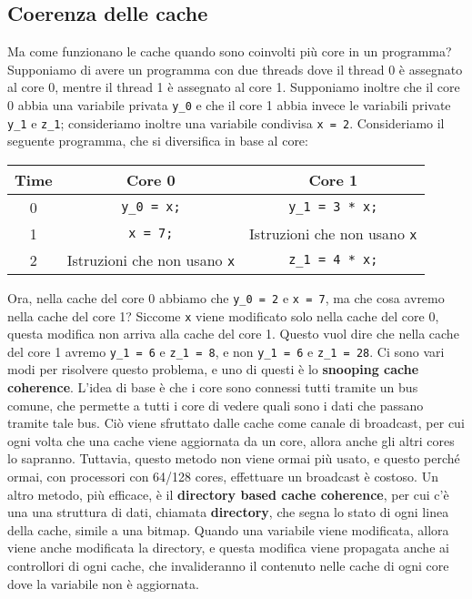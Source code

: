 \subsection{Coerenza delle cache}

Ma come funzionano le cache quando sono coinvolti più core in un programma? Supponiamo di avere un programma con due threads dove il thread 0 è assegnato al core 0, mentre il thread 1 è assegnato al core 1. Supponiamo inoltre che il core 0 abbia una variabile privata \verb|y_0| e che il core 1 abbia invece le variabili private \verb|y_1| e \verb|z_1|; consideriamo inoltre una variabile condivisa \verb|x = 2|. Consideriamo il seguente programma, che si diversifica in base al core:

\begin{center}
    \begin{tabular}{|c||c|c|}
        \hline
        Time & Core 0 & Core 1 \\
        \hline\hline
        0 & \verb|y_0 = x;| & \verb|y_1 = 3 * x;| \\
        \hline
        1 & \verb|x = 7;| & Istruzioni che non usano \verb|x| \\
        \hline
        2 & Istruzioni che non usano \verb|x| & \verb|z_1 = 4 * x;| \\
        \hline
    \end{tabular}
\end{center}

Ora, nella cache del core 0 abbiamo che \verb|y_0 = 2| e \verb|x = 7|, ma che cosa avremo nella cache del core 1? Siccome \verb|x| viene modificato solo nella cache del core 0, questa modifica non arriva alla cache del core 1. Questo vuol dire che nella cache del core 1 avremo \verb|y_1 = 6| e \verb|z_1 = 8|, e non \verb|y_1 = 6| e \verb|z_1 = 28|.
\nl
Ci sono vari modi per risolvere questo problema, e uno di questi è lo \textbf{snooping cache coherence}. L'idea di base è che i core sono connessi tutti tramite un bus comune, che permette a tutti i core di vedere quali sono i dati che passano tramite tale bus. Ciò viene sfruttato dalle cache come canale di broadcast, per cui ogni volta che una cache viene aggiornata da un core, allora anche gli altri cores lo sapranno. Tuttavia, questo metodo non viene ormai più usato, e questo perché ormai, con processori con 64/128 cores, effettuare un broadcast è costoso.
\nl
Un altro metodo, più efficace, è il \textbf{directory based cache coherence}, per cui c'è una una struttura di dati, chiamata \textbf{directory}, che segna lo stato di ogni linea della cache, simile a una bitmap. Quando una variabile viene modificata, allora viene anche modificata la directory, e questa modifica viene propagata anche ai controllori di ogni cache, che invalideranno il contenuto nelle cache di ogni core dove la variabile non è aggiornata.

